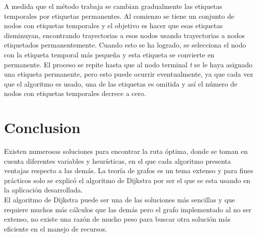       A medida que el método trabaja se cambian gradualmente las etiquetas temporales por etiquetas permanentes. Al comienzo se tiene un conjunto de nodos con etiquetas temporales y el objetivo es hacer que esas etiquetas disminuyan, encontrando trayectorias a esos nodos usando trayectorias a nodos etiquetados permanentemente. Cuando esto se ha logrado, se selecciona el nodo con la etiqueta temporal más pequeña y esta etiqueta se convierte en permanente. El proceso se repite hasta que al nodo terminal \emph{t} se le haya asignado una etiqueta permanente, pero esto puede ocurrir eventualmente, ya que cada vez que el algoritmo es usado, una de las etiquetas es omitida y así el número de nodos con etiquetas temporales decrece a cero. \cite{teoria_grafos} \\

      
  
  \section{Conclusion} %
  \label{sec:ruta_conclusion}

    Existen numerosas soluciones para encontrar la ruta óptima, donde se toman en cuenta diferentes variables y heurísticas, en el que  cada algoritmo presenta ventajas respecto a las demás.
    La teoría de grafos  es un tema extenso y para fines prácticos 
    solo se explicó el algoritmo de Dijkstra por ser el que se esta usando en la aplicación desarrollada.\\
    
    El algoritmo de Dijkstra puede ser una de las soluciones más sencillas y que requiere muchos más cálculos que las demás pero el grafo implementado al no ser extenso, no existe una razón de mucho peso para buscar otra solución más eficiente en el manejo de recursos.






  

